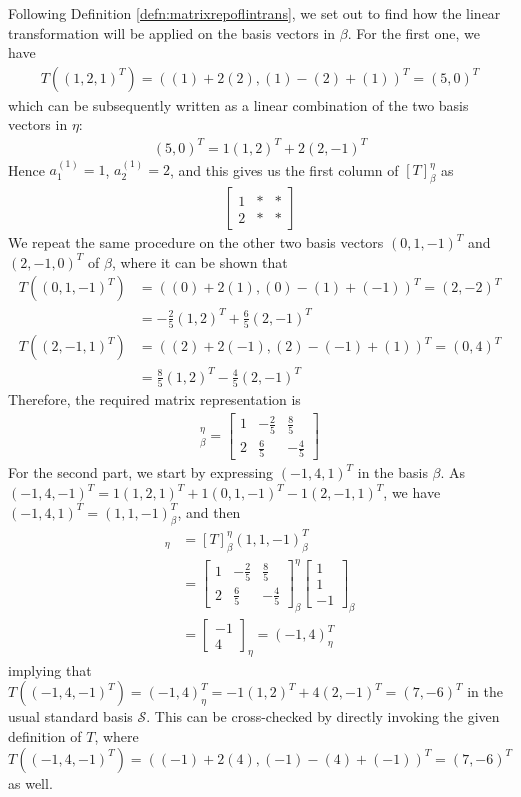 \begin{solution}
Following Definition \ref{defn:matrixrepoflintrans}, we set out to find how the linear transformation will be applied on the basis vectors in $\mathcal{\beta}$. For the first one, we have
\begin{align*}
T((1,2,1)^T) = ((1)+2(2), (1)-(2)+(1))^T = (5,0)^T
\end{align*}
which can be subsequently written as a linear combination of the two basis vectors in $\mathcal{\eta}$:
\begin{align*}
(5,0)^T = 1(1,2)^T + 2(2,-1)^T
\end{align*}
Hence $a_1^{(1)} = 1$, $a_2^{(1)} = 2$, and this gives us the first column of $[T]_\beta^\eta$ as
\begin{align*}
\begin{bmatrix}
1 & * & * \\
2 & * & * 
\end{bmatrix}
\end{align*}
We repeat the same procedure on the other two basis vectors $(0,1,-1)^T$ and $(2,-1,0)^T$ of $\mathcal{\beta}$, where it can be shown that
\begin{align*}
T((0,1,-1)^T) &= ((0)+2(1), (0)-(1)+(-1))^T = (2,-2)^T \\
&= -\frac{2}{5}(1,2)^T + \frac{6}{5}(2,-1)^T \\
T((2,-1,1)^T) &= ((2)+2(-1), (2)-(-1)+(1))^T = (0,4)^T \\
&= \frac{8}{5}(1,2)^T - \frac{4}{5}(2,-1)^T
\end{align*}
Therefore, the required matrix representation is
\begin{align*}
[T]_\beta^\eta = 
\begin{bmatrix}
1 & -\frac{2}{5} & \frac{8}{5} \\
2 & \frac{6}{5} & -\frac{4}{5}
\end{bmatrix}
\end{align*}
For the second part, we start by expressing $(-1,4,1)^T$ in the basis $\mathcal{\beta}$. As $(-1,4,-1)^T = 1(1,2,1)^T + 1(0,1,-1)^T - 1(2,-1,1)^T$, we have $(-1,4,1)^T = (1,1,-1)_\beta^T$, and then
\begin{align*}
[T((1,1,-1)_\beta^T)]_\eta &= [T]_\beta^\eta (1,1,-1)_\beta^T \\
&=
\begin{bmatrix}
1 & -\frac{2}{5} & \frac{8}{5} \\
2 & \frac{6}{5} & -\frac{4}{5}
\end{bmatrix}_\beta^\eta
\begin{bmatrix}
1 \\
1 \\
-1
\end{bmatrix}_\beta \\
&=
\begin{bmatrix}
-1 \\
4
\end{bmatrix}_\eta = (-1,4)^T_\eta
\end{align*}
implying that $T((-1,4,-1)^T) = (-1,4)_\eta^T = -1(1,2)^T + 4(2,-1)^T = (7,-6)^T$ in the usual standard basis $\mathcal{S}$. This can be cross-checked by directly invoking the given definition of $T$, where $T((-1,4,-1)^T) = ((-1)+2(4), (-1)-(4)+(-1))^T = (7,-6)^T$ as well.
\end{solution}
